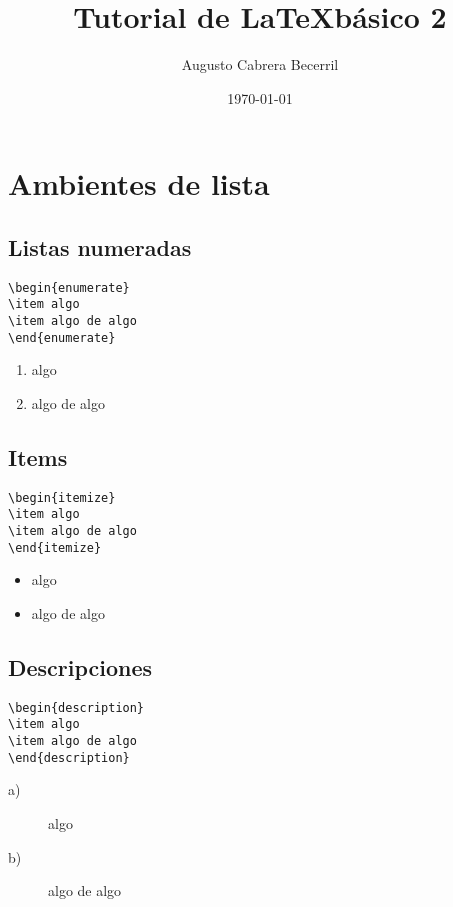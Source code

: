 \documentclass{article}
\title{Tutorial de \LaTeX básico 2}
\author{Augusto Cabrera Becerril}
\date{\today}
\begin{document}
\maketitle
\section{Ambientes de lista}

\subsection{Listas numeradas}

\begin{verbatim}
\begin{enumerate}
\item algo
\item algo de algo
\end{enumerate}
\end{verbatim}
\begin{enumerate}
\item algo
\item algo de algo
\end{enumerate}

\subsection{Items}

\begin{verbatim}
\begin{itemize}
\item algo
\item algo de algo
\end{itemize}
\end{verbatim}
\begin{itemize}
\item algo
\item algo de algo
\end{itemize}

\subsection{Descripciones}


\begin{verbatim}
\begin{description}
\item algo
\item algo de algo
\end{description}
\end{verbatim}
\begin{description}
\item[a)] algo
\item[b)] algo de algo
\end{description}
\end{document}
